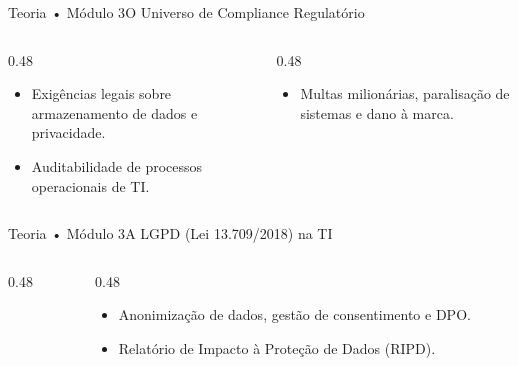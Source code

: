 \begin{senaiframe}{Teoria • Módulo 3}{O Universo de Compliance Regulatório}
  \begin{columns}[t]
    \begin{column}{0.48\textwidth}
      \begin{tcolorbox}[senaibluecard, title={Regulação da TI}]
        \begin{itemize}
          \item Exigências legais sobre armazenamento de dados e privacidade.
          \item Auditabilidade de processos operacionais de TI.
        \end{itemize}
      \end{tcolorbox}
    \end{column}
    \begin{column}{0.48\textwidth}
      \begin{tcolorbox}[senairedcard, title={Sanções de Não-Conformidade}]
        \begin{itemize}
          \item Multas milionárias, paralisação de sistemas e dano à marca.
        \end{itemize}
      \end{tcolorbox}
    \end{column}
  \end{columns}
\end{senaiframe}

\begin{senaiframe}{Teoria • Módulo 3}{A LGPD (Lei 13.709/2018) na TI}
  \begin{columns}[t]
    \begin{column}{0.48\textwidth}
      \begin{tcolorbox}[senaiambercard, title={Diretrizes Gerais}]
      \end{tcolorbox}
    \end{column}
    \begin{column}{0.48\textwidth}
      \begin{tcolorbox}[senaigreencard, title={Controles de TI}]
        \begin{itemize}
          \item Anonimização de dados, gestão de consentimento e DPO.
          \item Relatório de Impacto à Proteção de Dados (RIPD).
        \end{itemize}
      \end{tcolorbox}
    \end{column}
  \end{columns}
\end{senaiframe}

